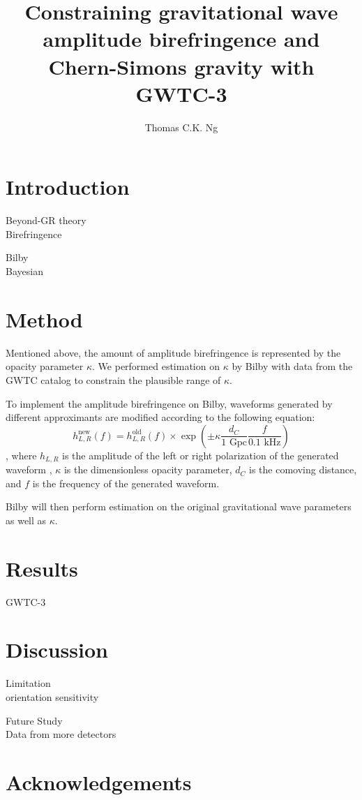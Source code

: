 \documentclass[twocolumn]{aastex631}
\begin{document}
\title{Constraining gravitational wave amplitude birefringence and Chern-Simons gravity with GWTC-3}

\author{Thomas C.K. Ng}

\begin{abstract}
    
\end{abstract}

\section{Introduction}

Beyond-GR theory\\
Birefringence\\
\citep{Maria_2021}

Bilby\\
Bayesian

\section{Method}

Mentioned above, the amount of amplitude birefringence is represented by the opacity parameter $\kappa$.
We performed estimation on $\kappa$ by Bilby with data from the GWTC catalog to constrain the plausible range of $\kappa$.

To implement the amplitude birefringence on Bilby, waveforms generated by different approximants are modified according to the following equation:
\begin{equation}
    h_{L,R}^{\textrm{new}}\left(f\right)=
    h_{L,R}^{\textrm{old}}\left(f\right)\times
    \exp\left(\pm\kappa\frac{d_C}{1\textrm{ Gpc}}\frac{f}{0.1\textrm{ kHz}}\right)
\end{equation}, where $h_{L,R}$ is the amplitude of the left or right polarization of the generated waveform
, $\kappa$ is the dimensionless opacity parameter, $d_C$ is the comoving distance, and $f$ is the frequency of the generated waveform.

Bilby will then perform estimation on the original gravitational wave parameters as well as $\kappa$.

\section{Results}

GWTC-3

\section{Discussion}

Limitation\\
orientation
sensitivity

Future Study\\
Data from more detectors

\section{Acknowledgements}




\end{document}
